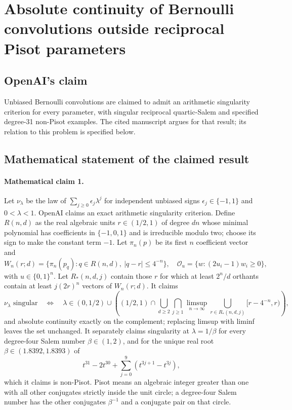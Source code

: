 \documentclass[11pt]{article}
\begin{document}
\section*{Absolute continuity of Bernoulli convolutions outside reciprocal Pisot parameters}

\subsection{OpenAI's claim}
Unbiased Bernoulli convolutions are claimed to admit an arithmetic singularity criterion for every parameter, with singular reciprocal quartic-Salem and specified degree-31 non-Pisot examples. The cited manuscript argues for that result; its relation to this problem is specified below.

\subsection{Mathematical statement of the claimed result}
\paragraph{Mathematical claim 1.} Let $\nu_\lambda$ be the law of $\sum_{j\ge0}\epsilon_j\lambda^j$ for independent unbiased signs $\epsilon_j\in\{-1,1\}$ and $0<\lambda<1$. OpenAI claims an exact arithmetic singularity criterion. Define $R(n,d)$ as the real algebraic units $r\in(1/2,1)$ of degree $dn$ whose minimal polynomial has coefficients in $\{-1,0,1\}$ and is irreducible modulo two; choose its sign to make the constant term $-1$. Let $\pi_n(p)$ be its first $n$ coefficient vector and
\[
W_n(r;d)=\{\pi_n(p_q):q\in R(n,d),\ |q-r|\le4^{-n}\},\quad
\mathcal O_u=\{w:(2u_i-1)w_i\ge0\},
\]
with $u\in\{0,1\}^n$. Let $R_*(n,d,j)$ contain those $r$ for which at least $2^n/d$ orthants contain at least $j(2r)^n$ vectors of $W_n(r;d)$. It claims
\[
\nu_\lambda\text{ singular}\quad\Longleftrightarrow\quad
\lambda\in(0,1/2)\cup\left((1/2,1)\cap\bigcup_{d\ge2}\bigcap_{j\ge1}\limsup_{n\to\infty}\bigcup_{r\in R_*(n,d,j)}[r-4^{-n},r)\right),
\]
and absolute continuity exactly on the complement; replacing limsup with liminf leaves the set unchanged.
It separately claims singularity at $\lambda=1/\beta$ for every degree-four Salem number $\beta\in(1,2)$, and for the unique real root $\beta\in(1.8392,1.8393)$ of
\[
t^{31}-2t^{30}+\sum_{j=0}^9(t^{3j+1}-t^{3j}),
\]
which it claims is non-Pisot. Pisot means an algebraic integer greater than one with all other conjugates strictly inside the unit circle; a degree-four Salem number has the other conjugates $\beta^{-1}$ and a conjugate pair on that circle.
\end{document}
